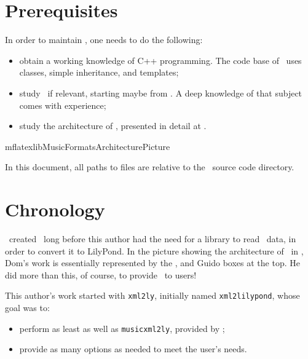 \section{Prerequisites}

In order to maintain \mf, one needs to do the following:
\begin{itemize}
\item obtain a working knowledge of C++ programming. The code base of \mf\ uses classes, simple inheritance, and templates;

\item study \mxml\ if relevant, starting maybe from . A deep knowledge of that subject comes with experience;

\item study the architecture of \mf, presented in detail at .
\end{itemize}

{mflatexlibMusicFormatsArchitecturePicture}

In this document, all paths to files are relative to the \mf\ source code directory.


\section{Chronology}

\fober\ created \libmusicxml\ long before this author had the need for a library to read \mxml\ data, in order to convert it to LilyPond.
In the picture showing the architecture of \mf\ in , Dom's work is essentially represented by the \mxml, \mxsrRepr and Guido boxes at the top. He did more than this, of course, to provide \libmusicxml\ to users!

This author's work started with {\tt xml2ly}, initially named {\tt xml2lilypond}, whose goal was to:
\begin{itemize}
\item perform as least as well as {\tt musicxml2ly}, provided by \lily;
\item provide as many options as needed to meet the user's needs.
\end{itemize}


